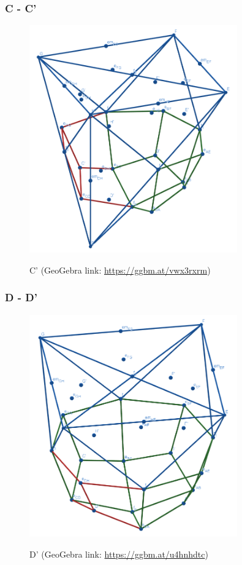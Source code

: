 \documentclass{article}
\begin{document}
\subsubsection{C - C'}
\begin{figure}[H]
\caption{C' (GeoGebra link: \href{https://ggbm.at/vwx3rxrm}{https://ggbm.at/vwx3rxrm})}
\centering
\includegraphics[width=0.8\textwidth]{images/cl-07-3.png}
\label{fig:cube7-3}
\end{figure}
\subsubsection{D - D'}
\begin{figure}[H]
\caption{D' (GeoGebra link: \href{https://ggbm.at/u4hnhdtc}{https://ggbm.at/u4hnhdtc})}
\centering
\includegraphics[width=0.8\textwidth]{images/cl-07-4.png}
\label{fig:cube7-4}
\end{figure}
\end{document}
